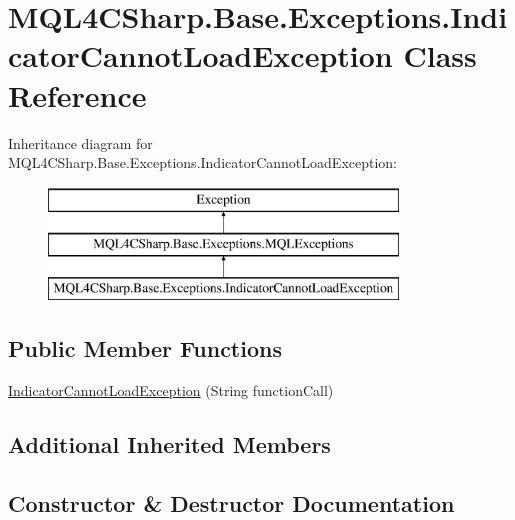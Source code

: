 \hypertarget{class_m_q_l4_c_sharp_1_1_base_1_1_exceptions_1_1_indicator_cannot_load_exception}{}\section{M\+Q\+L4\+C\+Sharp.\+Base.\+Exceptions.\+Indicator\+Cannot\+Load\+Exception Class Reference}
\label{class_m_q_l4_c_sharp_1_1_base_1_1_exceptions_1_1_indicator_cannot_load_exception}
Inheritance diagram for M\+Q\+L4\+C\+Sharp.\+Base.\+Exceptions.\+Indicator\+Cannot\+Load\+Exception\+:\begin{figure}[H]
\begin{center}
\leavevmode
\includegraphics[height=3.000000cm]{class_m_q_l4_c_sharp_1_1_base_1_1_exceptions_1_1_indicator_cannot_load_exception}
\end{center}
\end{figure}
\subsection*{Public Member Functions}
\begin{DoxyCompactItemize}
\item 
\hyperlink{class_m_q_l4_c_sharp_1_1_base_1_1_exceptions_1_1_indicator_cannot_load_exception_a18d2e97aa2af67561134bdb072909ad8}{Indicator\+Cannot\+Load\+Exception} (String function\+Call)
\end{DoxyCompactItemize}
\subsection*{Additional Inherited Members}


\subsection{Constructor \& Destructor Documentation}
